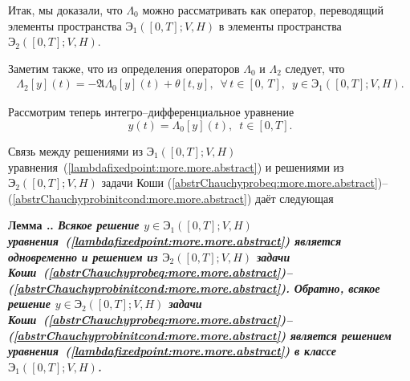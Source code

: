 \documentclass{report}
\newcounter{lem}[section]
\renewcommand{\thelem}{\thesection.\arabic{lem}}
\newenvironment{Lemma}{\par\refstepcounter{lem}\bf Лемма \thelem. \it}{\rm\par}
\begin{document}
Итак, мы доказали, что $\Lambda_0$ можно рассматривать как оператор, переводящий элементы пространства ${\textbf{Э}}_1([0,T];V,H)$ в элементы пространства ${\textbf{Э}}_2([0,T];V,H)$.

Заметим также, что из определения операторов $\Lambda_0$ и $\Lambda_2$ следует, что
\begin{gather}\label{Lambda2representation:more.more.abstract}
\Lambda_2[y](t)=-\mathfrak{A}\Lambda_0[y](t)+\theta[t,y],\,\,\,\forall\,t\in[0,\,T],\,\,\,y\in{\textbf{Э}}_1([0,T];V,H).
\end{gather}

Рассмотрим теперь интегро--дифференциальное уравнение
\begin{equation}\label{lambdafixedpoint:more.more.abstract}
y(t)=\Lambda_0[y](t),\,\,\,t\in[0,T].
\end{equation}

Связь между решениями из ${\textbf{Э}}_1([0,T];V,H)$ уравнения~(\ref{lambdafixedpoint:more.more.abstract}) и решениями из ${\textbf{Э}}_2([0,T];V,H)$ задачи Коши
(\ref{abstrChauchyprobeq:more.more.abstract})--(\ref{abstrChauchyprobinitcond:more.more.abstract}) даёт следующая
\begin{Lemma}\label{abstrcpequivabstrintegrdeq:more.more.abstract} Всякое решение $y\in{\textbf{Э}}_1([0,T];V,H)$ уравнения~(\ref{lambdafixedpoint:more.more.abstract}) является одновременно
и решением из ${\textbf{Э}}_2([0,T];V,H)$ задачи Коши~(\ref{abstrChauchyprobeq:more.more.abstract})--(\ref{abstrChauchyprobinitcond:more.more.abstract}). Обратно, всякое решение
$y\in{\textbf{Э}}_2([0,T];V,H)$ задачи Коши~(\ref{abstrChauchyprobeq:more.more.abstract})--(\ref{abstrChauchyprobinitcond:more.more.abstract}) является решением
уравнения~(\ref{lambdafixedpoint:more.more.abstract}) в классе ${\textbf{Э}}_1([0,T];V,H)$.
\end{Lemma}
\end{document}
